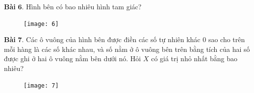\begin{multicols}{2}
	\textbf{Bài} $\pmb{6.}$ Hình bên có bao nhiêu hình tam giác?
	\begin{figure}[H]
		\centering
		\vspace*{-5pt}
		\captionsetup{labelformat= empty, justification=centering}
		\texttt{[image: 6]}
		\vspace*{-10pt}
	\end{figure}
	\textbf{Bài} $\pmb{7.}$ Các ô vuông của hình bên được điền các số tự nhiên khác $0$ sao cho trên mỗi hàng là các số khác nhau, và số nằm ở ô vuông bên trên bằng tích của hai số được ghi ở hai ô vuông nằm bên dưới nó.
	\vskip 0.1cm
	Hỏi $X$ có giá trị nhỏ nhất bằng bao nhiêu?
	\begin{figure}[H]
		\centering
		\vspace*{-5pt}
		\captionsetup{labelformat= empty, justification=centering}
		\texttt{[image: 7]}
		\vspace*{-10pt}
	\end{figure}	 
		 

\end{multicols}
